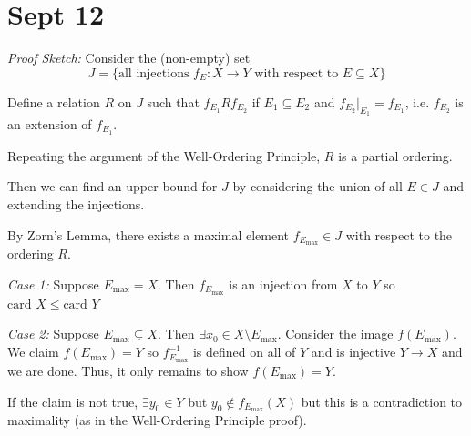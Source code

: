 \documentclass[12pt]{report}
\newcommand{\sub}{\subseteq}
\newcommand{\card}{\text{card }}
\newenvironment*{tbox}[2][gray]{
    \begin{tcolorbox}[
        parbox=false,
        colback=#1!5!white,
        colframe=#1!75!black,
        breakable,
        title={#2}
    ]}
    {\end{tcolorbox}}
\begin{document}
\section*{Sept 12}
    \begin{tbox}{\textbf{Property:} For any sets $X$ and $Y$, either $\card X \leq \card Y$ or $\card Y \leq \card X$}
        \emph{Proof Sketch:} Consider the (non-empty) set 
        \[J = \{\text{all injections } f_E: X \to Y \text{ with respect to } E \sub X\}\]
        
        Define a relation $R$ on $J$ such that $f_{E_1} R f_{E_2}$ if $E_1 \sub E_2$ and $f_{E_2}\big\vert_{E_1} = f_{E_1}$, i.e. $f_{E_2}$ is an extension of $f_{E_1}$.

        Repeating the argument of the Well-Ordering Principle, $R$ is a partial ordering. 

        Then we can find an upper bound for $J$ by considering the union of all $E \in J$ and extending the injections. 

        By Zorn's Lemma, there exists a maximal element $f_{E_{\max}} \in J$ with respect to the ordering $R$. 

        \emph{Case 1:} Suppose $E_{\max} = X$. Then $f_{E_{\max}}$ is an injection from $X$ to $Y$ so $\card X \leq \card Y$  

        \emph{Case 2:} Suppose $E_{\max} \subsetneq X$. Then $\exists x_0 \in X \setminus E_{\max}$. Consider the image $f(E_{\max})$. We claim $f(E_{\max}) = Y$ so $f_{E_{\max}}^{-1}$ is defined on all of $Y$ and is injective $Y \to X$ and we are done. Thus, it only remains to show $f(E_{\max}) = Y$. 

        If the claim is not true, $\exists y_0 \in Y$ but $y_0 \notin f_{E_{\max}}(X)$ but this is a contradiction to maximality (as in the Well-Ordering Principle proof).       
    \end{tbox}
\end{document}
